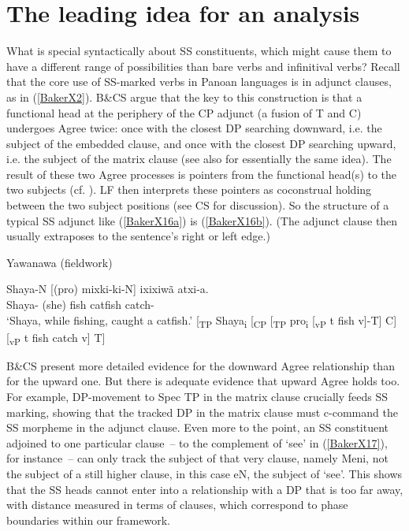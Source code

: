 \documentclass[output=paper]{langscibook}
\begin{document}
\section{The leading idea for an analysis}\label{sec:baker:4}

What is special syntactically about SS constituents, which might cause them to have a different range of possibilities than bare verbs and infinitival verbs? Recall that the core use of SS-marked verbs in Panoan languages is in adjunct clauses, as in (\ref{BakerX2}). B\&CS argue that the key to this construction is that a functional head at the periphery of the CP adjunct (a fusion of T and C) undergoes Agree twice: once with the closest DP searching downward, i.e. the subject of the embedded clause, and once with the closest DP searching upward, i.e. the subject of the matrix clause (see also \citet{arregi2019switch} for essentially the same idea). The result of these two Agree processes is pointers from the functional head(s) to the two subjects (cf. \citealt{arregi2012morphotactics}). LF then interprets these pointers as coconstrual holding between the two subject positions (see CS for discussion). So the structure of a typical SS adjunct like (\ref{BakerX16a}) is (\ref{BakerX16b}). (The adjunct clause then usually extraposes to the sentence’s right or left edge.)

\begin{exe}
\ex Yawanawa (fieldwork) \label{BakerX16}
    \begin{xlist}
		\ex \label{BakerX16a}
		\gll Shaya-N [(pro) mixki-ki-N] ixixiwã atxi-a.\\
		     Shaya- (she) fish catfish catch-\\
		    \glt `Shaya, while fishing, caught a catfish.'
		\ex \label{BakerX16b}
		    [\textsubscript{TP }Shaya\textsubscript{i} [\textsubscript{CP }[\textsubscript{TP }pro\textsubscript{i} [\textsubscript{vP } t fish v]-T] C] [\textsubscript{vP } t fish catch v] T]
	\end{xlist}
\end{exe}

B\&CS present more detailed evidence for the downward Agree relationship than for the upward one. But there is adequate evidence that upward Agree holds too. For example, DP-movement to Spec TP in the matrix clause crucially feeds SS marking, showing that the tracked DP in the matrix clause must c-command the SS morpheme in the adjunct clause. Even more to the point, an SS constituent adjoined to one particular clause~– to the complement of `see’ in (\ref{BakerX17}), for instance~– can only track the subject of that very clause, namely Meni, not the subject of a still higher clause, in this case eN, the subject of `see’. This shows that the SS heads cannot enter into a relationship with a DP that is too far away, with distance measured in terms of clauses, which correspond to phase boundaries within our framework.
\end{document}
